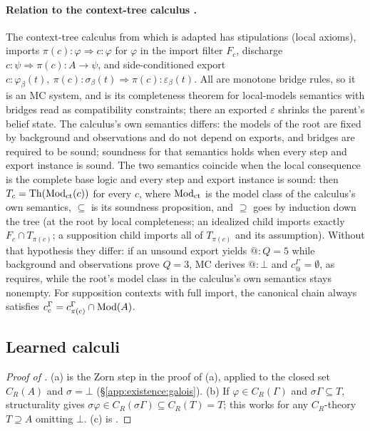 \paragraph{Relation to the context-tree calculus .} The context-tree calculus from which  is adapted has stipulations (local axioms), imports $\pi(c){:}\varphi\Rightarrow c{:}\varphi$ for $\varphi$ in the import filter $F_c$, discharge $c{:}\psi\Rightarrow\pi(c){:}A\to\psi$, and side-conditioned export $c{:}\varphi_\beta(t),\ \pi(c){:}\sigma_\beta(t)\Rightarrow\pi(c){:}\varepsilon_\beta(t)$. All are monotone bridge rules, so it is an MC system, and  is its completeness theorem for local-models semantics with bridges read as compatibility constraints; there an exported $\varepsilon$ shrinks the parent's belief state. The calculus's own semantics differs: the models of the root are fixed by background and observations and do not depend on exports, and bridges are required to be sound; soundness for that semantics holds when every step and export instance is sound. The two semantics coincide when the local consequence is the complete base logic and every step and export instance is sound: then $T_c=\mathrm{Th}(\mathrm{Mod}_{\mathrm{ct}}(c))$ for every $c$, where $\mathrm{Mod}_{\mathrm{ct}}$ is the model class of the calculus's own semantics, $\subseteq$ is its soundness proposition, and $\supseteq$ goes by induction down the tree (at the root by local completeness; an idealized child imports exactly $F_c\cap T_{\pi(c)}$; a supposition child imports all of $T_{\pi(c)}$ and its assumption). Without that hypothesis they differ: if an unsound export yields $@{:}Q=5$ while background and observations prove $Q=3$, MC derives $@{:}\bot$ and $c^\Gamma_@=\emptyset$, as  requires, while the root's model class in the calculus's own semantics stays nonempty. For supposition contexts with full import, the canonical chain always satisfies $c^\Gamma_c=c^\Gamma_{\pi(c)}\cap\mathrm{Mod}(A)$.

\subsection{Learned calculi}\label{app:existence:learned}

\begin{proof}[Proof of ]
(a) is the Zorn step in the proof of (a), applied to the closed set $C_R(A)$ and $\sigma=\bot$ (\S\ref{app:existence:galois}). (b) If $\varphi\in C_R(\Gamma)$ and $\sigma\Gamma\subseteq T$, structurality gives $\sigma\varphi\in C_R(\sigma\Gamma)\subseteq C_R(T)=T$; this works for any $C_R$-theory $T\supseteq A$ omitting $\bot$. (c) is .
\end{proof}

